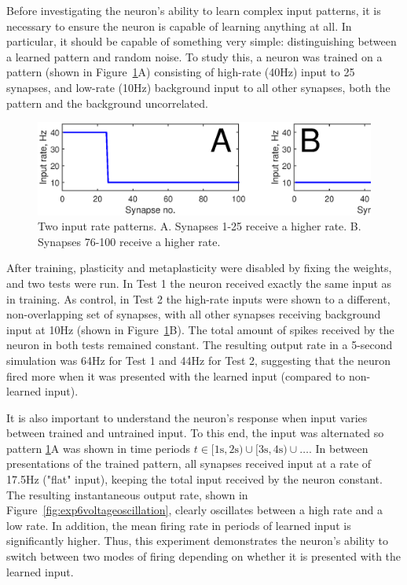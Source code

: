 \documentclass[a4paper,12pt]{report}
\theoremstyle{definition}
\begin{document}

Before investigating the neuron's ability to learn complex input patterns, it is necessary to ensure the neuron is capable of learning anything at all. In particular, it should be capable of something very simple: distinguishing between a learned pattern and random noise. To study this, a neuron was trained on a pattern (shown in Figure~\ref{fig:exp2_inputpatterns}A) consisting of high-rate (40Hz) input to 25 synapses, and low-rate (10Hz) background input to all other synapses, both the pattern and the background uncorrelated.

\begin{figure}[h]
    \centering
    \includegraphics[width=\textwidth]{figures/exp2_inputpatterns.eps}
    \caption{Two input rate patterns. A. Synapses 1-25 receive a higher rate. B. Synapses 76-100 receive a higher rate.}
    \label{fig:exp2_inputpatterns}
\end{figure}

After training, plasticity and metaplasticity were disabled by fixing the weights, and two tests were run. In Test 1 the neuron received exactly the same input as in training. As control, in Test 2 the high-rate inputs were shown to a different, non-overlapping set of synapses, with all other synapses receiving background input at 10Hz (shown in Figure~\ref{fig:exp2_inputpatterns}B). The total amount of spikes received by the neuron in both tests remained constant. The resulting output rate in a 5-second simulation was 64Hz for Test 1 and 44Hz for Test 2, suggesting that the neuron fired more when it was presented with the learned input (compared to non-learned input).


It is also important to understand the neuron's response when input varies between trained and untrained input. To this end, the input was alternated so pattern \ref{fig:exp2_inputpatterns}A was shown in time periods $t \in [1\mathrm{s}, 2\mathrm{s}) \cup [3\mathrm{s}, 4\mathrm{s}) \cup \ldots $. In between presentations of the trained pattern, all synapses received input at a rate of 17.5Hz ("flat" input), keeping the total input received by the neuron constant. The resulting instantaneous output rate, shown in Figure~\ref{fig:exp6voltageoscillation}, clearly oscillates between a high rate and a low rate. In addition, the mean firing rate in periods of learned input is significantly higher. Thus, this experiment demonstrates the neuron's ability to switch between two modes of firing depending on whether it is presented with the learned input.
\end{document}
